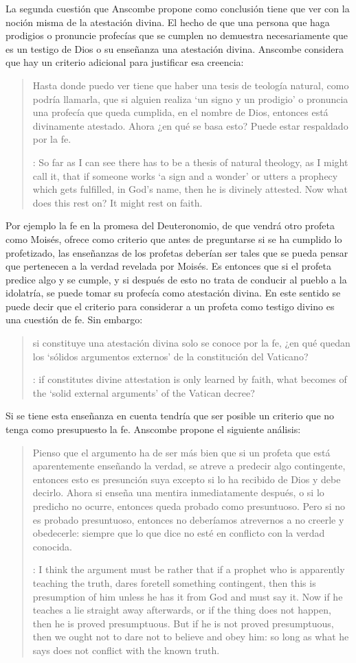 La segunda cuestión que Anscombe propone como conclusión tiene que ver con la
noción misma de la atestación divina. El hecho de que una persona que haga
prodigios o pronuncie profecías que se cumplen no demuestra necesariamente que
es un testigo de Dios o su enseñanza una atestación divina. Anscombe considera
que hay un criterio adicional para justificar esa creencia:
\blockquote[{\cite[38]{anscombe2008faith:prophandmi}}: So far as I can see there
has to be a thesis of natural theology, as I might call it, that if someone
works `a sign and a wonder' or utters a prophecy which gets fulfilled, in God's
name, then he is divinely attested. Now what does this rest on? It might rest on
faith.]{Hasta donde puedo ver tiene que haber una tesis de teología natural,
  como podría llamarla, que si alguien realiza `un signo y un prodigio' o
  pronuncia una profecía que queda cumplida, en el nombre de Dios, entonces está
  divinamente atestado. Ahora ¿en qué se basa esto? Puede estar respaldado por
  la fe.} Por ejemplo la fe en la promesa del Deuteronomio, de que vendrá otro
profeta como Moisés, ofrece como criterio que antes de preguntarse si se ha
cumplido lo profetizado, las enseñanzas de los profetas deberían ser tales que
se pueda pensar que pertenecen a la verdad revelada por Moisés. Es entonces que
si el profeta predice algo y se cumple, y si después de esto no trata de
conducir al pueblo a la idolatría, se puede tomar su profecía como atestación
divina. En este sentido se puede decir que el criterio para considerar a un
profeta como testigo divino es una cuestión de fe. Sin embargo:
\blockquote[{\cite[38]{anscombe2008faith:prophandmi}}: if 
constitutes divine attestation is only learned by faith, what becomes of the
`solid external arguments' of the Vatican decree?]{si 
  constituye una atestación divina solo se conoce por la fe, ¿en qué quedan los
  `sólidos argumentos externos' de la constitución del Vaticano?}. Si se tiene
esta enseñanza en cuenta tendría que ser posible un criterio que no tenga como
presupuesto la fe. Anscombe propone el siguiente análisis:
\blockquote[{\cite[38]{anscombe2008faith:prophandmi}}: I think the argument must
be rather that if a prophet who is apparently teaching the truth, dares foretell
something contingent, then this is presumption of him unless he has it from God
and must say it. Now if he teaches a lie straight away afterwards, or if the
thing does not happen, then he is proved presumptuous. But if he is not proved
presumptuous, then we ought not to dare not to believe and obey him: so long as
what he says does not conflict with the known truth.]{Pienso que el argumento ha
  de ser más bien que si un profeta que está aparentemente enseñando la verdad,
  se atreve a predecir algo contingente, entonces esto es presunción suya
  excepto si lo ha recibido de Dios y debe decirlo. Ahora si enseña una mentira
  inmediatamente después, o si lo predicho no ocurre, entonces queda probado
  como presuntuoso. Pero si no es probado presuntuoso, entonces no deberíamos
  atrevernos a no creerle y obedecerle: siempre que lo que dice no esté en
  conflicto con la verdad conocida.}

